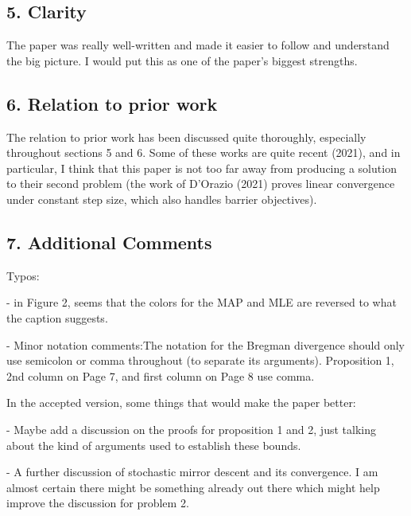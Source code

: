 \subsection*{5. Clarity}

The paper was really well-written and made it easier to follow and understand
the big picture. I would put this as one of the paper's biggest strengths.

\subsection*{6. Relation to prior work}

The relation to prior work has been discussed quite thoroughly, especially
throughout sections 5 and 6. Some of these works are quite recent (2021), and
in particular, I think that this paper is not too far away from producing
a solution to their second problem (the work of D'Orazio (2021) proves linear
convergence under constant step size, which also handles barrier objectives).

\subsection*{7. Additional Comments}

Typos:

- in Figure 2, seems that the colors for the MAP and MLE are reversed to
what the caption suggests.

- Minor notation comments:The notation for the Bregman divergence should only use semicolon or comma
throughout (to separate its arguments). Proposition 1, 2nd column on Page 7, and first column on Page 8
use comma.

In the accepted version, some things that would make the paper better:

- Maybe add a discussion on the proofs for proposition 1 and 2, just talking
about the kind of arguments used to establish these bounds.

- A further discussion of stochastic mirror descent and its convergence.
I am almost certain there might be something already out there which might
help improve the discussion for problem 2.

























